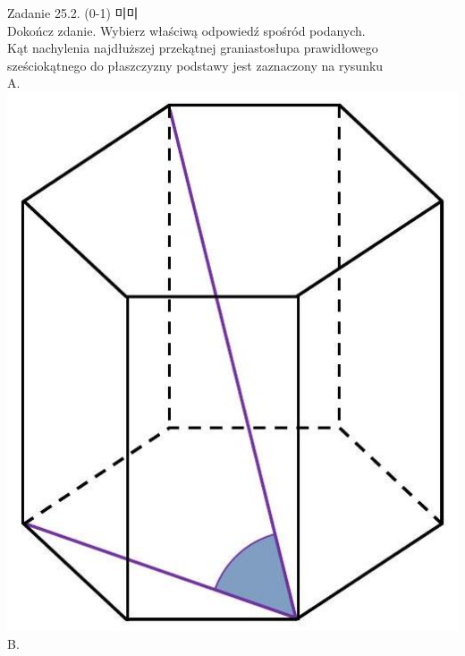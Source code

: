 \documentclass[10pt]{article}
\begin{document}
Zadanie 25.2. (0-1) 미미\\
Dokończ zdanie. Wybierz właściwą odpowiedź spośród podanych.\\
Kąt nachylenia najdłuższej przekątnej graniastosłupa prawidłowego sześciokątnego do płaszczyzny podstawy jest zaznaczony na rysunku\\
A.\\
\includegraphics[max width=\textwidth, center]{2024_11_21_daeb5e5efb43dd4cb535g-23(2)}\\
B.\\
\end{document}
